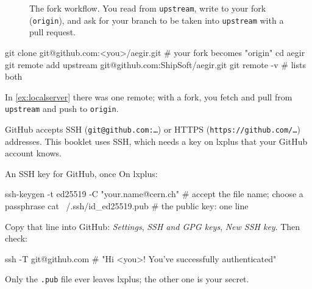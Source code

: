 \begin{figure}[ht]
\centering
{}
\caption{The fork workflow. You read from \texttt{upstream}, write to your
fork (\texttt{origin}), and ask for your branch to be taken into
\texttt{upstream} with a pull request.}
\label{fig:forks}
\end{figure}

\begin{shell}
git clone git@github.com:<you>/aegir.git        # your fork becomes "origin"
cd aegir
git remote add upstream git@github.com:ShipSoft/aegir.git
git remote -v                                    # lists both
\end{shell}

In \cref{ex:localserver} there was one remote; with a fork, you fetch and pull
from \texttt{upstream} and push to \texttt{origin}.

GitHub accepts SSH (\texttt{git@github.com:\ldots}) or HTTPS
(\texttt{https://github.com/\ldots}) addresses. This booklet uses SSH, which
needs a key on lxplus that your GitHub account knows.

\begin{exercise}{An SSH key for GitHub, once}
\label{ex:sshkey}
On lxplus:
\begin{shell}
ssh-keygen -t ed25519 -C "your.name@cern.ch"   # accept the file name; choose a passphrase
cat ~/.ssh/id_ed25519.pub                      # the public key: one line
\end{shell}
Copy that line into GitHub: \emph{Settings}, \emph{SSH and GPG keys},
\emph{New SSH key}. Then check:
\begin{shell}
ssh -T git@github.com          # "Hi <you>! You've successfully authenticated"
\end{shell}
Only the \texttt{.pub} file ever leaves lxplus; the other one is your secret.
\end{exercise}

